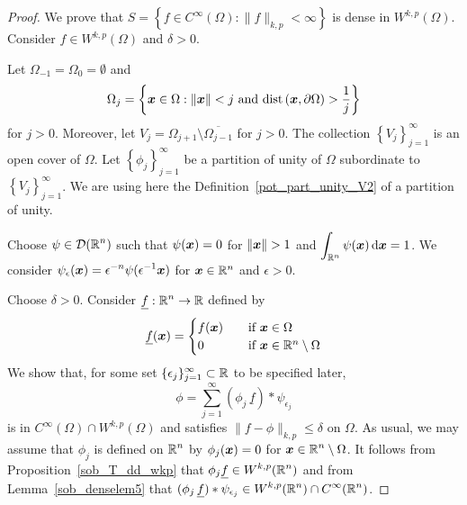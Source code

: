 \begin{proof}
We prove that
$\displaystyle
S = \left\{ f \in C^\infty(\Omega) :  \|f\|_{k,p} < \infty \right\}$
is dense in $\displaystyle W^{k,p}(\Omega)$.  Consider
$\displaystyle f\in W^{k,p}(\Omega)$ and $\delta>0$.

 Let $\displaystyle \Omega_{-1} = \Omega_0 = \emptyset$ and
\[
\Omega_j = \left\{ \VEC{x} \in \Omega : \|\VEC{x}\| < j \ \text{and} \ 
\dist{\VEC{x}}{\partial \Omega} > \frac{1}{j} \right\}
\]
for $j>0$.  Moreover, let
$\displaystyle V_j = \Omega_{j+1} \setminus \overline{\Omega_{j-1}}$
for $j>0$.
The collection $\displaystyle \left\{ V_j \right\}_{j=1}^\infty$ is an
open cover of $\Omega$.  Let
$\displaystyle \left\{ \phi_j \right\}_{j=1}^\infty$ be a partition
of unity of $\Omega$ subordinate to
$\displaystyle \left\{ V_j \right\}_{j=1}^\infty$.  We are using here
the Definition~\ref{pot_part_unity_V2} of a partition of unity.

Choose $\displaystyle \psi \in \mathcal{D}(\mathbb{R}^n)$ such that
$\psi({\bm{x}}) = 0$ for $\|\VEC{x}\|>1$ and
$\displaystyle \int_{\mathbb{R}^n} \psi({\bm{x}}) \,\mathrm{d}{{\bm{x}}} = 1$.
We consider
$\displaystyle \psi_\epsilon({\bm{x}}) = \epsilon^{-n}
\psi(\epsilon^{-1} {\bm{x}})$ for ${\bm{x}} \in \mathbb{R}^n$ and $\epsilon>0$.

 Choose $\delta >0$.  Consider
$\displaystyle \underline{f}: \mathbb{R}^n \to \mathbb{R}$ defined by
\[
\underline{f}({\bm{x}}) =
\begin{cases}
f({\bm{x}}) & \quad \text{if} \ {\bm{x}} \in \Omega \\
0 & \quad \text{if} \ {\bm{x}} \in \mathbb{R}^n \setminus \Omega
\end{cases}
\]
We show that, for some set
$\displaystyle \{\epsilon_j\}_{j=1}^\infty \subset \mathbb{R}$ to be
specified later,
\begin{equation} \label{sob_HequalsW_phi}
\phi = \sum_{j=1}^\infty (\phi_j\,\underline{f}) \ast \psi_{\epsilon_j}
\end{equation}
is in $\displaystyle C^\infty(\Omega) \cap W^{k,p}(\Omega)$ and satisfies
$\|f-\phi\|_{k,p} \leq \delta$ on $\Omega$.  As usual, we may assume
that $\phi_j$ is defined on $\displaystyle \mathbb{R}^n$ by $\phi_j({\bm{x}}) = 0$ for
$\displaystyle {\bm{x}} \in \mathbb{R}^n\setminus \Omega$.
It follows from Proposition~\ref{sob_T_dd_wkp} that
$\displaystyle \phi_j \underline{f} \in W^{k,p}(\mathbb{R}^n)$ and from
Lemma~\ref{sob_denselem5} that
$\displaystyle (\phi_j\,\underline{f}) \ast \psi_{\epsilon_j} \in
W^{k,p}(\mathbb{R}^n) \cap C^\infty(\mathbb{R}^n)$.


\end{proof}
